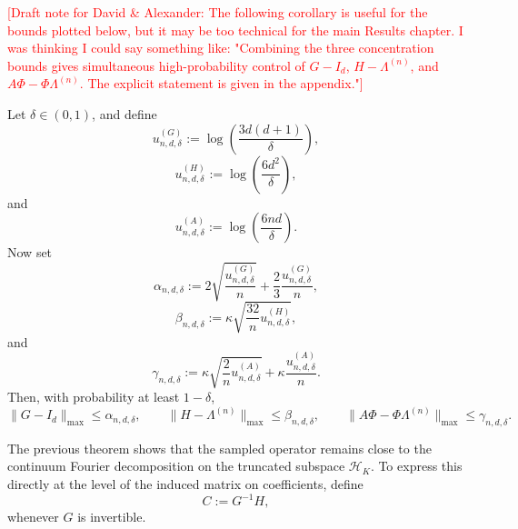 \textcolor{red}{[Draft note for David \& Alexander: The following corollary is useful for the bounds plotted below,
			but it may be too technical for the main Results chapter. I was thinking
			I could say something like: "Combining the three concentration bounds gives simultaneous high-probability
			control of \(G-I_d\), \(H-\Lambda^{(n)}\), and
			\(A\Phi-\Phi\Lambda^{(n)}\). The explicit statement is given in
			the appendix."]}

\begin{corollary}
	\label{cor:results-simultaneous-control}
	Let \(\delta\in(0,1)\), and define
	\begin{equation}
		u_{n,d,\delta}^{(G)}
		:=
		\log\!\left(\frac{3d(d+1)}{\delta}\right),
		\label{eq:results-uG}
	\end{equation}
	\begin{equation}
		u_{n,d,\delta}^{(H)}
		:=
		\log\!\left(\frac{6d^2}{\delta}\right),
		\label{eq:results-uH}
	\end{equation}
	and
	\begin{equation}
		u_{n,d,\delta}^{(A)}
		:=
		\log\!\left(\frac{6nd}{\delta}\right).
		\label{eq:results-uA}
	\end{equation}
	Now set
	\begin{equation}
		\alpha_{n,d,\delta}
		:=
		2\sqrt{\frac{u_{n,d,\delta}^{(G)}}{n}}
		+\frac{2}{3}\frac{u_{n,d,\delta}^{(G)}}{n},
		\label{eq:results-alpha}
	\end{equation}
	\begin{equation}
		\beta_{n,d,\delta}
		:=
		\kappa\sqrt{\frac{32}{n}u_{n,d,\delta}^{(H)}},
		\label{eq:results-beta}
	\end{equation}
	and
	\begin{equation}
		\gamma_{n,d,\delta}
		:=
		\kappa\sqrt{\frac{2}{n}u_{n,d,\delta}^{(A)}}
		+\kappa\frac{u_{n,d,\delta}^{(A)}}{n}.
		\label{eq:results-gamma}
	\end{equation}
	Then, with probability at least \(1-\delta\),
	\begin{equation}
		\|G-I_d\|_{\max}\le \alpha_{n,d,\delta},
		\qquad
		\|H-\Lambda^{(n)}\|_{\max}\le \beta_{n,d,\delta},
		\qquad
		\|A\Phi-\Phi\Lambda^{(n)}\|_{\max}\le \gamma_{n,d,\delta}.
		\label{eq:results-simultaneous-bounds}
	\end{equation}
\end{corollary}

The previous theorem shows that the sampled operator remains close to the continuum Fourier
decomposition on the truncated subspace \(\mathcal H_K\). To express this directly at the level of the
induced matrix on coefficients, define
\begin{equation}
	C:=G^{-1}H,
	\label{eq:results-restricted-operator}
\end{equation}
whenever \(G\) is invertible.


